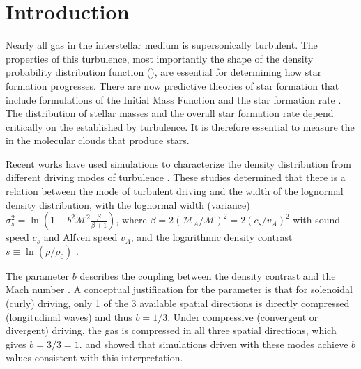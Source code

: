 

\ifstandalone


\fi

% 

\section{Introduction}
Nearly all gas in the interstellar medium is supersonically turbulent.  The
properties of this turbulence, most importantly the shape of the density
probability distribution function (\rhoPDF), are essential for determining how star
formation progresses.
There are now predictive theories of star formation that include formulations
of the Initial Mass Function \citep[IMF;][]{Padoan2002a, Padoan2007a, Hennebelle2008a, Hennebelle2009a, Chabrier2010a, 
Elmegreen2011a, Hopkins2012b, Hennebelle2013a} and the star
formation rate
\citep[SFR;][]{Krumholz2005c,  Hennebelle2011a,
Padoan2011b, Krumholz2012b, Federrath2012a, Padoan2012a, Federrath2013a}.
The distribution of stellar masses and the overall star formation rate depend
critically on the \rhoPDF established by turbulence.  It is therefore essential to
measure the \rhoPDF in the molecular clouds that produce stars.

Recent works have used simulations to characterize the density distribution
from different driving modes of turbulence
\citep{Federrath2008a,Federrath2009a,Federrath2010a,Federrath2011a,Price2011b,Federrath2013a}.
These studies determined that there is a relation between the mode of turbulent driving and the width
of the lognormal density distribution, with the lognormal width (variance) $\sigma_{s}^2 = \ln\left(1+b^2
\mathcal{M}^2 \frac{\beta}{\beta+1}\right)$, where $\beta=2 (\mathcal{M}_A /
\mathcal{M})^2 = 2 (c_s/v_A)^2$ with sound speed $c_s$ and Alfven speed $v_A$,
and the logarithmic density contrast $s\equiv\ln(\rho/\rho_0)$ 
\citep[][]{Padoan2011b,Molina2012a}.

The parameter $b$ describes the coupling between the density contrast and the
Mach number \citep{Federrath2008a,Federrath2010a}.  A conceptual justification
for the parameter is that for solenoidal (curly) driving, only 1 of the 3
available spatial directions is directly compressed (longitudinal waves) and
thus $b=1/3$. Under compressive (convergent or divergent) driving, the gas is
compressed in all three spatial directions, which gives $b=3/3=1$.
\citet{Federrath2008a} and \citet{Federrath2010a} showed that simulations
driven with these modes achieve $b$ values consistent with this interpretation.


